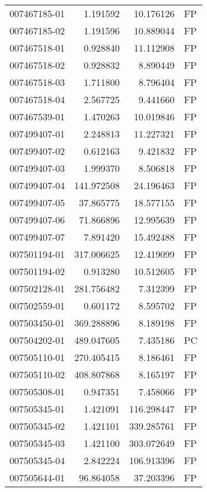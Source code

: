 \begin{tabular}{lrrl}
007467185-01 &    1.191592 &      10.176126 &   FP \\
007467185-02 &    1.191596 &      10.889044 &   FP \\
007467518-01 &    0.928840 &      11.112908 &   FP \\
007467518-02 &    0.928832 &       8.890449 &   FP \\
007467518-03 &    1.711800 &       8.796404 &   FP \\
007467518-04 &    2.567725 &       9.441660 &   FP \\
007467539-01 &    1.470263 &      10.019846 &   FP \\
007499407-01 &    2.248813 &      11.227321 &   FP \\
007499407-02 &    0.612163 &       9.421832 &   FP \\
007499407-03 &    1.999370 &       8.506818 &   FP \\
007499407-04 &  141.972508 &      24.196463 &   FP \\
007499407-05 &   37.865775 &      18.577155 &   FP \\
007499407-06 &   71.866896 &      12.995639 &   FP \\
007499407-07 &    7.891420 &      15.492488 &   FP \\
007501194-01 &  317.006625 &      12.419099 &   FP \\
007501194-02 &    0.913280 &      10.512605 &   FP \\
007502128-01 &  281.756482 &       7.312399 &   FP \\
007502559-01 &    0.601172 &       8.595702 &   FP \\
007503450-01 &  369.288896 &       8.189198 &   FP \\
007504202-01 &  489.047605 &       7.435186 &   PC \\
007505110-01 &  270.405415 &       8.186461 &   FP \\
007505110-02 &  408.807868 &       8.165197 &   FP \\
007505308-01 &    0.947351 &       7.458066 &   FP \\
007505345-01 &    1.421091 &     116.298447 &   FP \\
007505345-02 &    1.421101 &     339.285761 &   FP \\
007505345-03 &    1.421100 &     303.072649 &   FP \\
007505345-04 &    2.842224 &     106.913396 &   FP \\
007505644-01 &   96.864058 &      37.203396 &   FP \\

\end{tabular}
